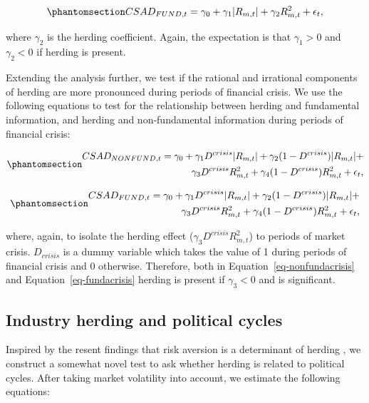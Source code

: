 \documentclass[
  letterpaper,
  DIV=11,
  numbers=noendperiod]{scrartcl}
\begin{document}
\begin{equation}\phantomsection\label{eq-fundaherd}{CSAD_{FUND,t} = \gamma_0 +  \gamma_1|R_{m, t}| +  \gamma_2R_{m, t}^2 + \epsilon_{t},}\end{equation}

where \(\gamma_2\) is the herding coefficient. Again, the expectation is
that \(\gamma_1 > 0\) and \(\gamma_2 < 0\) if herding is present.

Extending the analysis further, we test if the rational and irrational
components of herding are more pronounced during periods of financial
crisis. We use the following equations to test for the relationship
between herding and fundamental information, and herding and
non-fundamental information during periods of financial crisis:

\begin{equation}\phantomsection\label{eq-nonfundacrisis}{
\begin{aligned}
CSAD_{NONFUND, t} = \gamma_0 +  \gamma_1D^{crisis}|R_{m, t}| + \gamma_2(1 - D^{crisis})|R_{m,t}|  + \\  
\gamma_3D^{crisis}R_{m, t}^2 + \gamma_4(1-D^{crisis})R_{m,t}^2 + \epsilon_{t},
\end{aligned}
}\end{equation}

\begin{equation}\phantomsection\label{eq-fundacrisis}{
\begin{aligned}
CSAD_{FUND, t} = \gamma_0 +  \gamma_1D^{crisis}|R_{m, t}| + \gamma_2(1 - D^{crisis})|R_{m,t}|  + \\ \gamma_3D^{crisis}R_{m, t}^2 + \gamma_4(1-D^{crisis})R_{m,t}^2 + \epsilon_{t},
\end{aligned}
}\end{equation}

where, again, to isolate the herding effect
(\(\gamma_3D^{crisis}R_{m, t}^2\)) to periods of market crisis.
\(D_{crisis}\) is a dummy variable which takes the value of 1 during
periods of financial crisis and 0 otherwise. Therefore, both in
Equation~\ref{eq-nonfundacrisis} and Equation~\ref{eq-fundacrisis}
herding is present if \(\gamma_3 < 0\) and is significant.

\subsection{Industry herding and political
cycles}\label{industry-herding-and-political-cycles}

Inspired by the resent findings that risk aversion is a determinant of
herding \citep{nath2020investor}, we construct a somewhat novel test to
ask whether herding is related to political cycles. After taking market
volatility into account, we estimate the following equations:
\end{document}
